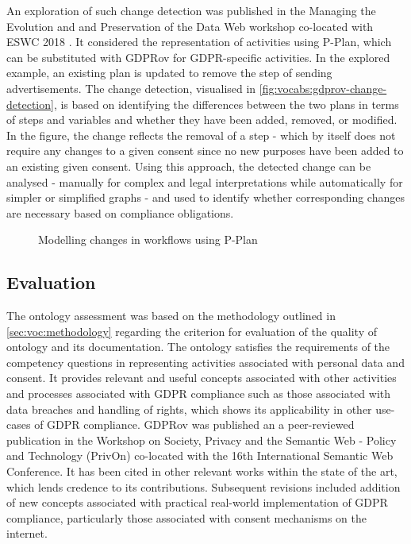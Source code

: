 An exploration of such change detection was published in the Managing the Evolution and and Preservation of the Data Web workshop co-located with ESWC 2018 \cite{}.
It considered the representation of activities using P-Plan, which can be substituted with GDPRov for GDPR-specific activities. In the explored example, an existing plan is updated to remove the step of sending advertisements. The change detection, visualised in \autoref{fig:vocabs:gdprov-change-detection}, is based on identifying the differences between the two plans in terms of steps and variables and whether they have been added, removed, or modified.
In the figure, the change reflects the removal of a step - which by itself does not require any changes to a given consent since no new purposes have been added to an existing given consent.
Using this approach, the detected change can be analysed - manually for complex and legal interpretations while automatically for simpler or simplified graphs - and used to identify whether corresponding changes are necessary based on compliance obligations.
\begin{figure}[htbp]
    \centering
    \missingfigure[figcolor=white]{}
    \caption{Modelling changes in workflows using P-Plan \cite{}}
    \label{fig:vocabs:gdprov-change-detection}
\end{figure}

\subsection{Evaluation}
The ontology assessment was based on the methodology outlined in \autoref{sec:voc:methodology} regarding the criterion for evaluation of the quality of ontology and its documentation.
The ontology satisfies the requirements of the competency questions in representing activities associated with personal data and consent.
It provides relevant and useful concepts associated with other activities and processes associated with GDPR compliance such as those associated with data breaches and handling of rights, which shows its applicability in other use-cases of GDPR compliance.
GDPRov was published \cite{} an a peer-reviewed publication in the Workshop on Society, Privacy and the Semantic Web - Policy and Technology (PrivOn) co-located with the 16th International Semantic Web Conference. It has been cited in other relevant works \cite{} within the state of the art, which lends credence to its contributions.
Subsequent revisions included addition of new concepts associated with practical real-world implementation of GDPR compliance, particularly those associated with consent mechanisms on the internet.

